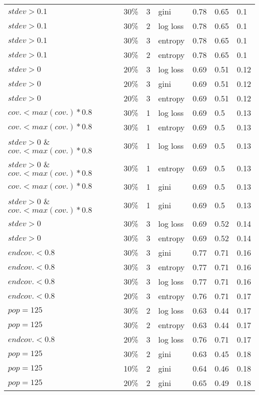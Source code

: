 \begin{tabular}{lllllll}
$stdev > 0.1$	&	30\%	&	3	&	gini	&	0.78	&	0.65	&	0.1 \\
$stdev > 0.1$	&	30\%	&	2	&	log loss	&	0.78	&	0.65	&	0.1 \\
$stdev > 0.1$	&	30\%	&	3	&	entropy	&	0.78	&	0.65	&	0.1 \\
$stdev > 0.1$	&	30\%	&	2	&	entropy	&	0.78	&	0.65	&	0.1 \\
$stdev > 0$	&	20\%	&	3	&	log loss	&	0.69	&	0.51	&	0.12 \\
$stdev > 0$	&	20\%	&	3	&	gini	&	0.69	&	0.51	&	0.12 \\
$stdev > 0$	&	20\%	&	3	&	entropy	&	0.69	&	0.51	&	0.12 \\
$cov. < max(cov.) * 0.8$	&	30\%	&	1	&	log loss	&	0.69	&	0.5	&	0.13 \\
$cov. < max(cov.) * 0.8$	&	30\%	&	1	&	entropy	&	0.69	&	0.5	&	0.13 \\
$stdev > 0$ \& $cov. < max(cov.) * 0.8$	&	30\%	&	1	&	log loss	&	0.69	&	0.5	&	0.13 \\
$stdev > 0$ \& $cov. < max(cov.) * 0.8$	&	30\%	&	1	&	entropy	&	0.69	&	0.5	&	0.13 \\
$cov. < max(cov.) * 0.8$	&	30\%	&	1	&	gini	&	0.69	&	0.5	&	0.13 \\
$stdev > 0$ \& $cov. < max(cov.) * 0.8$	&	30\%	&	1	&	gini	&	0.69	&	0.5	&	0.13 \\
$stdev > 0$	&	30\%	&	3	&	log loss	&	0.69	&	0.52	&	0.14 \\
$stdev > 0$	&	30\%	&	3	&	entropy	&	0.69	&	0.52	&	0.14 \\
$end cov. < 0.8$	&	30\%	&	3	&	gini	&	0.77	&	0.71	&	0.16 \\
$end cov. < 0.8$	&	30\%	&	3	&	entropy	&	0.77	&	0.71	&	0.16 \\
$end cov. < 0.8$	&	30\%	&	3	&	log loss	&	0.77	&	0.71	&	0.16 \\
$end cov. < 0.8$	&	20\%	&	3	&	entropy	&	0.76	&	0.71	&	0.17 \\
$pop = 125$	&	30\%	&	2	&	log loss	&	0.63	&	0.44	&	0.17 \\
$pop = 125$	&	30\%	&	2	&	entropy	&	0.63	&	0.44	&	0.17 \\
$end cov. < 0.8$	&	20\%	&	3	&	log loss	&	0.76	&	0.71	&	0.17 \\
$pop = 125$	&	30\%	&	2	&	gini	&	0.63	&	0.45	&	0.18 \\
$pop = 125$	&	10\%	&	2	&	gini	&	0.64	&	0.46	&	0.18 \\
$pop = 125$	&	20\%	&	2	&	gini	&	0.65	&	0.49	&	0.18 \\
\hline
\end{tabular}